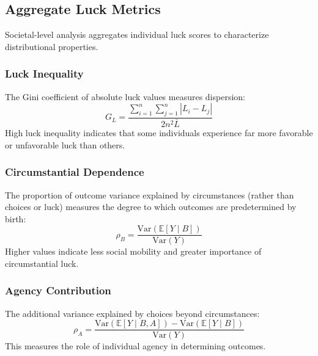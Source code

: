   \subsection{Aggregate Luck Metrics}

  Societal-level analysis aggregates individual luck scores to
  characterize distributional properties.

  \subsubsection{Luck Inequality}

  The Gini coefficient of absolute luck values measures dispersion:
  \begin{equation}
    G_{L} = \frac{\sum_{i=1}^{n}\sum_{j=1}^{n}|L_{i} - L_{j}|}{2n^{2}\bar{L}}
  \end{equation}
  High luck inequality indicates that some individuals experience far
  more favorable or unfavorable luck than others.

  \subsubsection{Circumstantial Dependence}

  The proportion of outcome variance explained by circumstances (rather
  than choices or luck) measures the degree to which outcomes are predetermined
  by birth:
  \begin{equation}
    \rho_{B} = \frac{\text{Var}(\mathbb{E}[Y \mid B])}{\text{Var}(Y)}
  \end{equation}
  Higher values indicate less social mobility and greater importance of
  circumstantial luck.

  \subsubsection{Agency Contribution}

  The additional variance explained by choices beyond circumstances:
  \begin{equation}
    \rho_{A} = \frac{\text{Var}(\mathbb{E}[Y \mid B, A]) - \text{Var}(\mathbb{E}[Y
    \mid B])}{\text{Var}(Y)}
  \end{equation}
  This measures the role of individual agency in determining outcomes.

